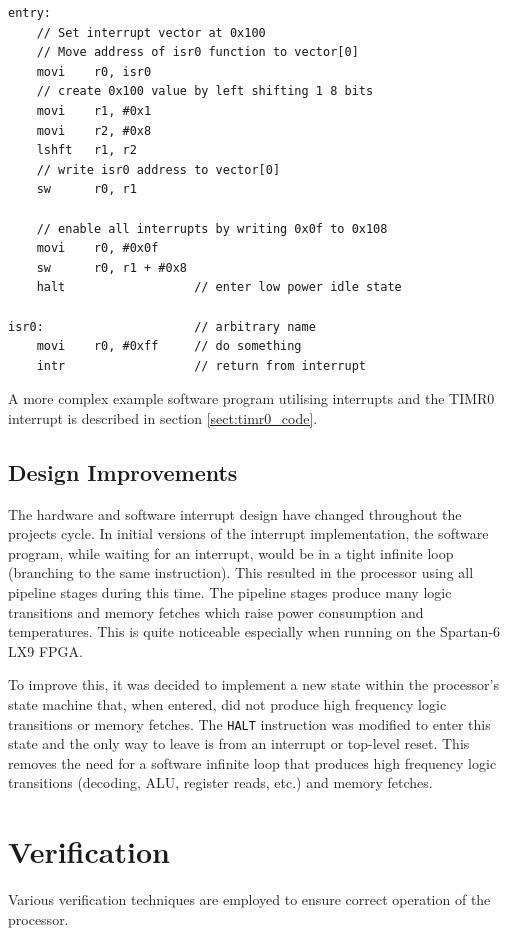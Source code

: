 \begin{verbatim}
entry:
    // Set interrupt vector at 0x100
    // Move address of isr0 function to vector[0]
    movi    r0, isr0
    // create 0x100 value by left shifting 1 8 bits
    movi    r1, #0x1
    movi    r2, #0x8
    lshft   r1, r2
    // write isr0 address to vector[0]
    sw      r0, r1
    
    // enable all interrupts by writing 0x0f to 0x108
    movi    r0, #0x0f
    sw      r0, r1 + #0x8
    halt                  // enter low power idle state
    
isr0:                     // arbitrary name
    movi    r0, #0xff     // do something
    intr                  // return from interrupt
\end{verbatim}

A more complex example software program utilising interrupts and the TIMR0 interrupt is described in section \ref{sect:timr0_code}.

\subsection{Design Improvements}
The hardware and software interrupt design have changed throughout the projects cycle. In initial versions of the interrupt implementation, the software program, while waiting for an interrupt, would be in a tight infinite loop (branching to the same instruction). This resulted in the processor using all pipeline stages during this time. The pipeline stages produce many logic transitions and memory fetches which raise power consumption and temperatures. This is quite noticeable especially when running on the Spartan-6 LX9 FPGA.

To improve this, it was decided to implement a new state within the processor's state machine that, when entered, did not produce high frequency logic transitions or memory fetches. The \verb|HALT| instruction was modified to enter this state and the only way to leave is from an interrupt or top-level reset. This removes the need for a software infinite loop that produces high frequency logic transitions (decoding, ALU, register reads, etc.) and memory fetches.





\section{Verification}
Various verification techniques are employed to ensure correct operation of the processor.

